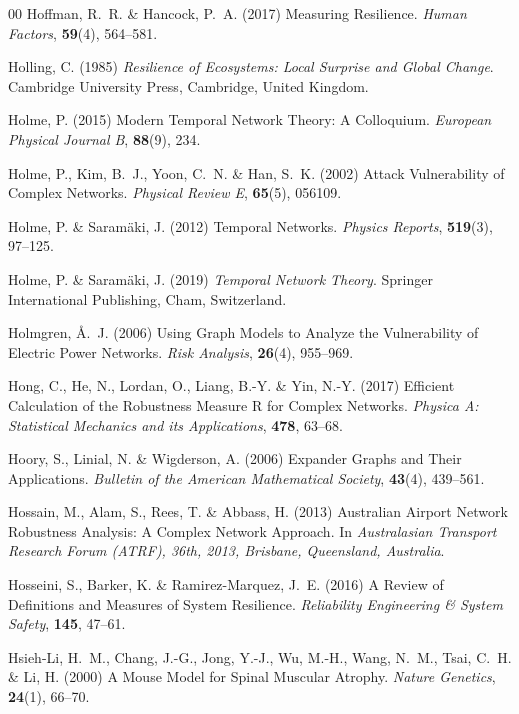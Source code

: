 \documentclass{comnet-mod}
\begin{document}
\begin{thebibliography}{00}
Hoffman, R.~R. {\&} Hancock, P.~A. (2017)  {Measuring Resilience}. {\em {Human
  Factors}}, \textbf{59}(4), 564--581.

Holling, C. (1985) {\em {Resilience of Ecosystems: Local Surprise and Global
  Change}}.
{Cambridge University Press}, Cambridge, United Kingdom.

Holme, P. (2015)  Modern Temporal Network Theory: {A} Colloquium. {\em European
  Physical Journal B}, \textbf{88}(9), 234.

Holme, P., Kim, B.~J., Yoon, C.~N. {\&} Han, S.~K. (2002)  {Attack
  Vulnerability of Complex Networks}. {\em {Physical Review E}},
  \textbf{65}(5), 056109.

Holme, P. {\&} Saram{\"a}ki, J. (2012)  {Temporal Networks}. {\em {Physics
  Reports}}, \textbf{519}(3), 97--125.

Holme, P. {\&} Saram{\"a}ki, J. (2019) {\em {Temporal Network Theory}}.
{Springer International Publishing}, {Cham, Switzerland}.

Holmgren, {\AA}.~J. (2006)  {Using Graph Models to Analyze the Vulnerability of
  Electric Power Networks}. {\em {Risk Analysis}}, \textbf{26}(4), 955--969.

Hong, C., He, N., Lordan, O., Liang, B.-Y. {\&} Yin, N.-Y. (2017)  {Efficient
  Calculation of the Robustness Measure {{R}} for Complex Networks}. {\em
  {Physica A: Statistical Mechanics and its Applications}}, \textbf{478},
  63--68.

Hoory, S., Linial, N. {\&} Wigderson, A. (2006)  {Expander Graphs and Their
  Applications}. {\em {Bulletin of the American Mathematical Society}},
  \textbf{43}(4), 439--561.

Hossain, M., Alam, S., Rees, T. {\&} Abbass, H. (2013)  {Australian Airport
  Network Robustness Analysis: {{A}} Complex Network Approach}. In {\em
  {Australasian Transport Research Forum ({{ATRF}}), 36th, 2013, Brisbane,
  Queensland, Australia}}.

Hosseini, S., Barker, K. {\&} {Ramirez-Marquez}, J.~E. (2016)  {A Review of
  Definitions and Measures of System Resilience}. {\em {Reliability Engineering
  \& System Safety}}, \textbf{145}, 47--61.

{Hsieh-Li}, H.~M., Chang, J.-G., Jong, Y.-J., Wu, M.-H., Wang, N.~M., Tsai,
  C.~H. {\&} Li, H. (2000)  {A Mouse Model for Spinal Muscular Atrophy}. {\em
  {Nature Genetics}}, \textbf{24}(1), 66--70.


\end{thebibliography}
\end{document}

